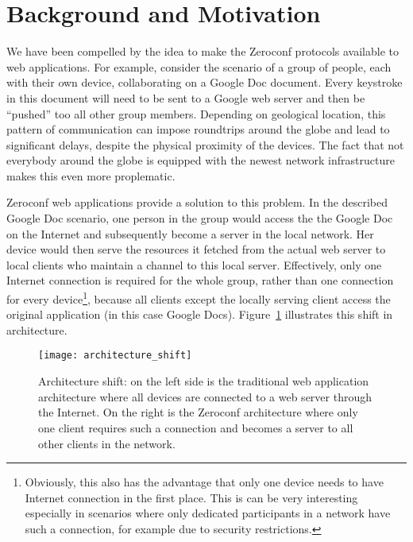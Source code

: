 \section{Background and Motivation}
\label{sec:background_and_motivation}

We have been compelled by the idea to make the Zeroconf protocols available to web applications.
For example, consider the scenario of a group of people, each with their own device, collaborating on a Google Doc document.
Every keystroke in this document will need to be sent to a Google web server and then be ``pushed'' too all other group members.
Depending on geological location, this pattern of communication can impose roundtrips around the globe and lead to significant delays, despite the physical proximity of the devices.
The fact that not everybody around the globe is equipped with the newest network infrastructure makes this even more proplematic.

Zeroconf web applications provide a solution to this problem.
In the described Google Doc scenario, one person in the group would access the the Google Doc on the Internet and subsequently become a server in the local network.
Her device would then serve the resources it fetched from the actual web server to local clients who maintain a channel to this local server.
Effectively, only one Internet connection is required for the whole group, rather than one connection for every device\footnote{Obviously, this also has the advantage that only one device needs to have Internet connection in the first place. This is can be very interesting especially in scenarios where only dedicated participants in a network have such a connection, for example due to security restrictions.}, because all clients except the locally serving client access the original application (in this case Google Docs). Figure~\ref{fig:architecture_shift} illustrates this shift in architecture.

\begin{figure}[h]
    \centering
    \texttt{[image: architecture\_shift]}
    \caption{Architecture shift: on the left side is the traditional web application architecture where all devices are connected to a web server through the Internet. On the right is the Zeroconf architecture where only one client requires such a connection and becomes a server to all other clients in the network.}
    \label{fig:architecture_shift}
\end{figure}

